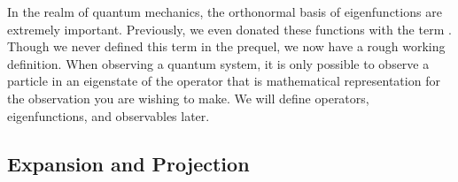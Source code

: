 In the realm of quantum mechanics, the orthonormal basis of eigenfunctions are extremely important. Previously, we even donated these functions with the term .  Though we never defined this term in the prequel, we now have a rough working definition.  When observing a quantum system, it is only possible to observe a particle in an eigenstate of the operator that is mathematical representation for the observation you are wishing to make.  We will define operators, eigenfunctions, and observables later.

\subsection{Expansion and Projection}

